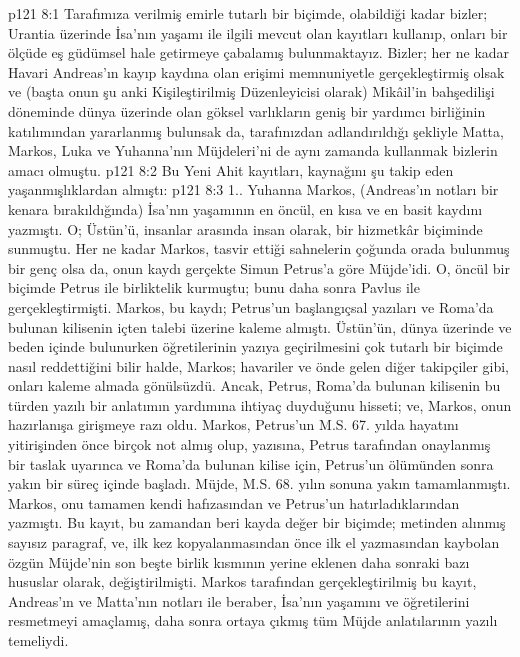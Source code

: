 \vs p121 8:1 Tarafımıza verilmiş emirle tutarlı bir biçimde, olabildiği kadar bizler; Urantia üzerinde İsa’nın yaşamı ile ilgili mevcut olan kayıtları kullanıp, onları bir ölçüde eş güdümsel hale getirmeye çabalamış bulunmaktayız. Bizler; her ne kadar Havari Andreas’ın kayıp kaydına olan erişimi memnuniyetle gerçekleştirmiş olsak ve (başta onun şu anki Kişileştirilmiş Düzenleyicisi olarak) Mikâil’in bahşedilişi döneminde dünya üzerinde olan göksel varlıkların geniş bir yardımcı birliğinin katılımından yararlanmış bulunsak da, tarafınızdan adlandırıldığı şekliyle Matta, Markos, Luka ve Yuhanna’nın Müjdeleri’ni de aynı zamanda kullanmak bizlerin amacı olmuştu.
\vs p121 8:2 Bu Yeni Ahit kayıtları, kaynağını şu takip eden yaşanmışlıklardan almıştı:
\vs p121 8:3 1.. Yuhanna Markos, (Andreas’ın notları bir kenara bırakıldığında) İsa’nın yaşamının en öncül, en kısa ve en basit kaydını yazmıştı. O; Üstün’ü, insanlar arasında insan olarak, bir hizmetkâr biçiminde sunmuştu. Her ne kadar Markos, tasvir ettiği sahnelerin çoğunda orada bulunmuş bir genç olsa da, onun kaydı gerçekte Simun Petrus’a göre Müjde’idi. O, öncül bir biçimde Petrus ile birliktelik kurmuştu; bunu daha sonra Pavlus ile gerçekleştirmişti. Markos, bu kaydı; Petrus’un başlangıçsal yazıları ve Roma’da bulunan kilisenin içten talebi üzerine kaleme almıştı. Üstün’ün, dünya üzerinde ve beden içinde bulunurken öğretilerinin yazıya geçirilmesini çok tutarlı bir biçimde nasıl reddettiğini bilir halde, Markos; havariler ve önde gelen diğer takipçiler gibi, onları kaleme almada gönülsüzdü. Ancak, Petrus, Roma’da bulunan kilisenin bu türden yazılı bir anlatımın yardımına ihtiyaç duyduğunu hisseti; ve, Markos, onun hazırlanışa girişmeye razı oldu. Markos, Petrus’un M.S. 67. yılda hayatını yitirişinden önce birçok not almış olup, yazısına, Petrus tarafından onaylanmış bir taslak uyarınca ve Roma’da bulunan kilise için, Petrus’un ölümünden sonra yakın bir süreç içinde başladı. Müjde, M.S. 68. yılın sonuna yakın tamamlanmıştı. Markos, onu tamamen kendi hafızasından ve Petrus’un hatırladıklarından yazmıştı. Bu kayıt, bu zamandan beri kayda değer bir biçimde; metinden alınmış sayısız paragraf, ve, ilk kez kopyalanmasından önce ilk el yazmasından kaybolan özgün Müjde’nin son beşte birlik kısmının yerine eklenen daha sonraki bazı hususlar olarak, değiştirilmişti. Markos tarafından gerçekleştirilmiş bu kayıt, Andreas’ın ve Matta’nın notları ile beraber, İsa’nın yaşamını ve öğretilerini resmetmeyi amaçlamış, daha sonra ortaya çıkmış tüm Müjde anlatılarının yazılı temeliydi.
